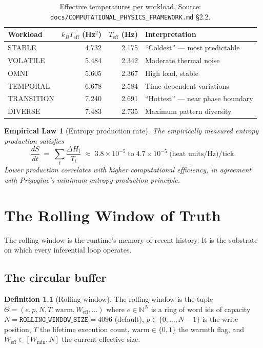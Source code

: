 \documentclass[11pt,letterpaper,openany]{book}
\theoremstyle{definition}
\newtheorem{definition}{Definition}[chapter]
\theoremstyle{plain}
\newtheorem{empiricallaw}[definition]{Empirical Law}
\newcommand{\Wmin}{W_{\mathrm{min}}}
\newcommand{\Teff}{T_{\mathrm{eff}}}
\begin{document}
\begin{table}[H]
  \centering\small
  \begin{tabular}{l r r l}
    \toprule
    Workload    & $k_B\Teff$ (Hz$^2$) & $\Teff$ (Hz) & Interpretation \\
    \midrule
    STABLE      & 4.732 & 2.175 & ``Coldest'' --- most predictable \\
    VOLATILE    & 5.484 & 2.342 & Moderate thermal noise \\
    OMNI        & 5.605 & 2.367 & High load, stable \\
    TEMPORAL    & 6.678 & 2.584 & Time-dependent variations \\
    TRANSITION  & 7.240 & 2.691 & ``Hottest'' --- near phase boundary \\
    DIVERSE     & 7.483 & 2.735 & Maximum pattern diversity \\
    \bottomrule
  \end{tabular}
  \caption{Effective temperatures per workload. Source:
    \texttt{docs/COMPUTATIONAL\_PHYSICS\_FRAMEWORK.md} \S2.2.}
\end{table}

\begin{empiricallaw}[Entropy production rate]\label{law:dsdt}
The empirically measured entropy production satisfies
\begin{equation}\label{eq:dsdt}
  \frac{dS}{dt} \;=\; \sum_i \frac{\Delta H_i}{T_i}
  \;\approx\; 3.8\times 10^{-5} \;\text{to}\; 4.7\times 10^{-5}\;
  \text{(heat units/Hz)/tick}.
\end{equation}
Lower production correlates with higher computational efficiency, in
agreement with Prigogine's minimum-entropy-production principle.
\end{empiricallaw}


\chapter{The Rolling Window of Truth}
\label{ch:rolling-window}

The rolling window is the runtime's memory of recent history. It is the
substrate on which every inferential loop operates.

\section{The circular buffer}

\begin{definition}[Rolling window]\label{def:roll-window}
The rolling window is the tuple
$\Theta = (e,p,N,T,\mathrm{warm},W_{\mathrm{eff}},\dots)$ where
$e\in\mathbb{N}^N$ is a ring of word ids of capacity
$N = \mathtt{ROLLING\_WINDOW\_SIZE} = 4096$ (default), $p \in \{0,\dots,N-1\}$
is the write position, $T$ the lifetime execution count, $\mathrm{warm} \in \{0,1\}$
the warmth flag, and $W_{\mathrm{eff}} \in [\Wmin,N]$ the current effective size.
\end{definition}
\end{document}
